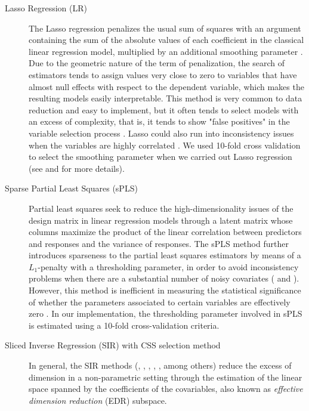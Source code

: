 \documentclass[12pt]{amsart}
\theoremstyle{plain}
\theoremstyle{definition}
\theoremstyle{remark}
\begin{document}
\begin{description}
\item[Lasso Regression (LR)]
  The Lasso regression penalizes the usual sum of squares with an argument
 containing the sum of the absolute values of each coefficient in the classical
 linear regression model, multiplied by an additional smoothing parameter \citep{Tibshirani1996}. Due
 to the geometric nature of the term of penalization, the search of estimators
 tends to assign values very close to zero to variables that have almost null
 effects with respect to the dependent variable, which makes the resulting
 models easily interpretable. This method is very common to data reduction and easy to implement, but it often tends to select models with an excess of complexity, that is,
 it tends to show "false positives" in the variable selection process 
 \citep{Fan2010}. Lasso could also run into inconsistency issues when the
 variables are highly correlated \citep{Zou2005}.
 We used 10-fold cross validation to select the smoothing parameter when we carried out Lasso regression (see \cite{Tibshirani1996} and \cite{Friedman2010} for more details). 
\item[Sparse Partial Least Squares (sPLS)] 
  Partial least squares seek to reduce the high-dimensionality issues of the
  design matrix in  
  linear regression models through a latent matrix whose columns maximize
  the product of the linear correlation between predictors and responses and the
  variance of responses. The sPLS method further introduces sparseness to the partial least squares
  estimators by means of a $L_1$-penalty with a thresholding parameter, in order to avoid inconsistency problems when there are a
  substantial number of noisy covariates (\cite{Chun2010} and
  \cite{Chung2013}). However, this method is inefficient in
  measuring the statistical significance of whether the parameters associated to certain
  variables are effectively zero \citep{OlsonHunt2014}. In our implementation, the
  thresholding parameter involved in sPLS is estimated using a 10-fold cross-validation criteria.    
\item[Sliced Inverse Regression (SIR) with CSS selection method]
  In general, the SIR methods (\cite{Li1991},
  \cite{Duan1991}, \cite{Zhong2005}, \cite{Li2008}, \cite{Coudret2014}, \cite{Weisberg2002} among
  others) reduce the excess of dimension in a non-parametric setting through the
  estimation of the linear space spanned by the coefficients of the covariables,
  also known as \textit{effective dimension reduction} (EDR) subspace. 

\end{description}
\end{document}
